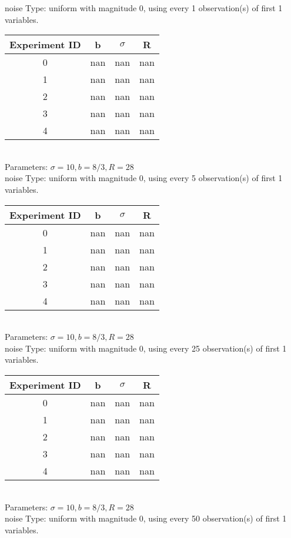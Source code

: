 \begin{multicols}{3}
noise Type: uniform with magnitude 0, using every 1 observation(s) of first 1 variables.\\
\begin{tabular}{cccc}
\hline Experiment ID & b & $\sigma$ & R \\ \hline 
0 & nan & nan & nan\\ \hline 
 1 & nan & nan & nan\\ \hline 
 2 & nan & nan & nan\\ \hline 
 3 & nan & nan & nan\\ \hline 
 4 & nan & nan & nan\\ \hline 
 \end{tabular}\\
Parameters: $\sigma=10, b=8/3, R=28$\\
noise Type: uniform with magnitude 0, using every 5 observation(s) of first 1 variables.\\
\begin{tabular}{cccc}
\hline Experiment ID & b & $\sigma$ & R \\ \hline 
0 & nan & nan & nan\\ \hline 
 1 & nan & nan & nan\\ \hline 
 2 & nan & nan & nan\\ \hline 
 3 & nan & nan & nan\\ \hline 
 4 & nan & nan & nan\\ \hline 
 \end{tabular}\\
Parameters: $\sigma=10, b=8/3, R=28$\\
noise Type: uniform with magnitude 0, using every 25 observation(s) of first 1 variables.\\
\begin{tabular}{cccc}
\hline Experiment ID & b & $\sigma$ & R \\ \hline 
0 & nan & nan & nan\\ \hline 
 1 & nan & nan & nan\\ \hline 
 2 & nan & nan & nan\\ \hline 
 3 & nan & nan & nan\\ \hline 
 4 & nan & nan & nan\\ \hline 
 \end{tabular}\\
Parameters: $\sigma=10, b=8/3, R=28$\\
noise Type: uniform with magnitude 0, using every 50 observation(s) of first 1 variables.\\
\begin{tabular}{cccc}

\end{tabular}
\end{multicols}
